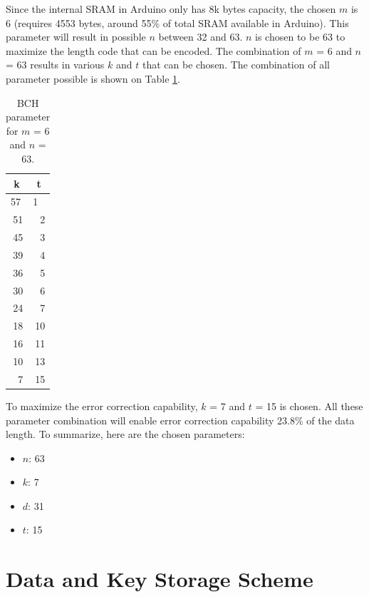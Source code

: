 Since the internal SRAM in Arduino only has 8k bytes capacity, the chosen $m$ is 6 (requires 4553 bytes, around 55\% of total SRAM available in Arduino). This parameter will result in possible $n$ between 32 and 63. $n$ is chosen to be 63 to maximize the length code that can be encoded.
The combination of $m$ = 6 and $n$ = 63 results in various $k$ and $t$ that can be chosen. The combination of all parameter possible is shown on Table \ref{tab:bch}.

\begin{table}[htbp]
  \centering
  \caption{BCH parameter for $m$ = 6 and $n$ = 63.}
    \begin{tabular}{|r|r|}
    \hline
    \multicolumn{1}{|c|}{\textbf{k}} & \multicolumn{1}{c|}{\textbf{t}} \\
    \hline
    \multicolumn{1}{|l|}{57} & \multicolumn{1}{l|}{1} \\
    \hline
    51    & 2 \\
    \hline
    45    & 3 \\
    \hline
    39    & 4 \\
    \hline
    36    & 5 \\
    \hline
    30    & 6 \\
    \hline
    24    & 7 \\
    \hline
    18    & 10 \\
    \hline
    16    & 11 \\
    \hline
    10    & 13 \\
    \hline
    7     & 15 \\
    \hline
    \end{tabular}%
  \label{tab:bch}%
\end{table}%
To maximize the error correction capability, $k$ = 7 and $t$ = 15 is chosen. All these parameter combination will enable error correction capability 23.8\% of the data length. To summarize, here are the chosen parameters:
\begin{itemize}
\item $n$: 63
\item $k$: 7
\item $d$: 31
\item $t$: 15
\end{itemize}

\section{Data and Key Storage Scheme} \label{chp:data_protection_scheme}

